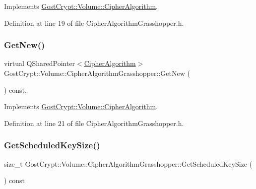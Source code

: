 Implements \hyperlink{class_gost_crypt_1_1_volume_1_1_cipher_algorithm_a6074cb14cf571b9879eb9f6ac85c1487}{Gost\+Crypt\+::\+Volume\+::\+Cipher\+Algorithm}.



Definition at line 19 of file Cipher\+Algorithm\+Grasshopper.\+h.

\mbox{\label{class_gost_crypt_1_1_volume_1_1_cipher_algorithm_grasshopper_a6760e0603b5af70b2ff697831b1813d0}} 
\subsubsection{\texorpdfstring{Get\+New()}{GetNew()}}
{\footnotesize\ttfamily virtual Q\+Shared\+Pointer$<$\hyperlink{class_gost_crypt_1_1_volume_1_1_cipher_algorithm}{Cipher\+Algorithm}$>$ Gost\+Crypt\+::\+Volume\+::\+Cipher\+Algorithm\+Grasshopper\+::\+Get\+New (\begin{DoxyParamCaption}{ }\end{DoxyParamCaption}) const\hspace{0.3cm}{\ttfamily [inline]}, {\ttfamily [virtual]}}



Implements \hyperlink{class_gost_crypt_1_1_volume_1_1_cipher_algorithm_a623a1b2ec1b28d583e432f3915eccfc4}{Gost\+Crypt\+::\+Volume\+::\+Cipher\+Algorithm}.



Definition at line 21 of file Cipher\+Algorithm\+Grasshopper.\+h.

\mbox{\label{class_gost_crypt_1_1_volume_1_1_cipher_algorithm_grasshopper_adcc6948022fd1274d9e16d99e5ee442d}} 
\subsubsection{\texorpdfstring{Get\+Scheduled\+Key\+Size()}{GetScheduledKeySize()}}
{\footnotesize\ttfamily size\+\_\+t Gost\+Crypt\+::\+Volume\+::\+Cipher\+Algorithm\+Grasshopper\+::\+Get\+Scheduled\+Key\+Size (\begin{DoxyParamCaption}{ }\end{DoxyParamCaption}) const\hspace{0.3cm}{\ttfamily [virtual]}}



